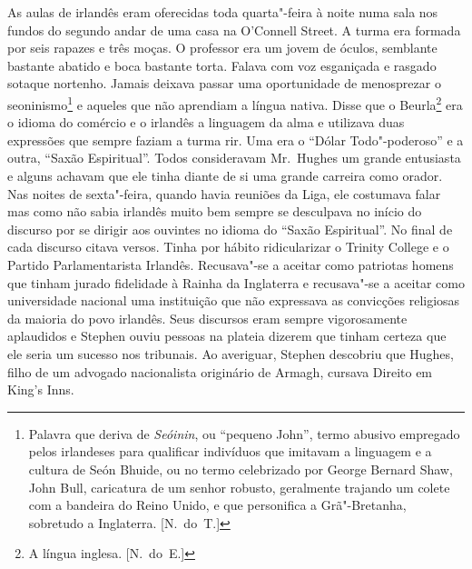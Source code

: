 As aulas de irlandês eram oferecidas toda quarta"-feira à noite numa
sala nos fundos do segundo andar de uma casa na O’Connell Street.  A
turma era formada por seis rapazes e três moças.  O professor era um
jovem de óculos, semblante bastante abatido e boca bastante torta.
Falava com voz esganiçada e rasgado sotaque nortenho.  Jamais deixava
passar uma oportunidade de menosprezar o seoninismo\footnote{ Palavra
que deriva de \textit{Seóinin}, ou “pequeno John”, termo abusivo
empregado pelos irlandeses para qualificar indivíduos que imitavam a
linguagem e a cultura de Seón Bhuide, ou no termo celebrizado por
George Bernard Shaw, John Bull, caricatura de um senhor robusto,
geralmente trajando um colete com a bandeira do Reino Unido, e que
personifica a Grã"-Bretanha, sobretudo a Inglaterra. [N.~do~T.]} e aqueles
que não aprendiam a língua nativa.  Disse que o Beurla\footnote{ A
língua inglesa. [N.~do~E.]} era o idioma do comércio e o irlandês a
linguagem da alma e utilizava duas expressões que sempre faziam a turma
rir.  Uma era o “Dólar Todo"-poderoso” e a outra, “Saxão Espiritual”.
Todos consideravam Mr.~Hughes um grande entusiasta e alguns achavam que
ele tinha diante de si uma grande carreira como orador.  Nas noites de
sexta"-feira, quando havia reuniões da Liga, ele costumava falar mas
como não sabia irlandês muito bem sempre se desculpava no início do
discurso por se dirigir aos ouvintes no idioma do “Saxão Espiritual”.
No final de cada discurso citava versos.  Tinha por
hábito ridicularizar o Trinity College e o Partido Parlamentarista
Irlandês.  Recusava"-se a aceitar como \mbox{patriotas} homens que tinham
jurado fidelidade à Rainha da Inglaterra e recusava"-se a aceitar como
universidade nacional uma instituição que não expressava as convicções
religiosas da maioria do povo irlandês.  Seus discursos eram sempre
vigorosamente aplaudidos e Stephen ouviu pessoas na plateia dizerem que
tinham certeza que ele seria um sucesso nos tribunais.  Ao averiguar,
Stephen descobriu que Hughes, filho de um advogado nacionalista
originário de Armagh, cursava Direito em King’s Inns.

